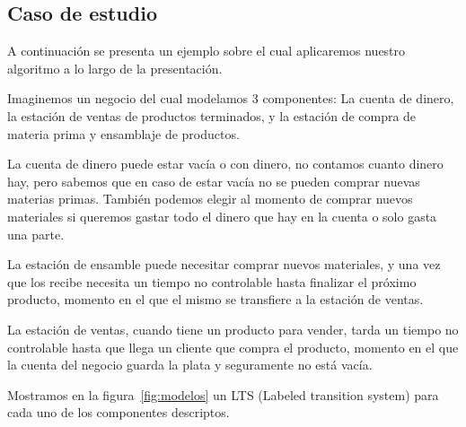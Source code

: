 \documentclass[11pt,a4paper,twoside]{tesis}
\begin{document}
\subsection{Caso de estudio}
A continuación se presenta un ejemplo sobre el cual aplicaremos nuestro algoritmo a lo largo de la presentación. 

Imaginemos un negocio del cual modelamos 3 componentes: La cuenta de dinero, la estación de ventas de productos terminados, y la estación de compra de materia prima y ensamblaje de productos.

La cuenta de dinero puede estar vacía o con dinero, no contamos cuanto dinero hay, pero sabemos que en caso de estar vacía no se pueden comprar nuevas materias primas. También podemos elegir al momento de comprar nuevos materiales si queremos gastar todo el dinero que hay en la cuenta o solo gasta una parte.

La estación de ensamble puede necesitar comprar nuevos materiales, y una vez que los recibe necesita un tiempo no controlable hasta finalizar el próximo producto, momento en el que el mismo se transfiere a la estación de ventas.

La estación de ventas, cuando tiene un producto para vender, tarda un tiempo no controlable hasta que llega un cliente que compra el producto, momento en el que la cuenta del negocio guarda la plata y seguramente no está vacía.

Mostramos en la figura~\ref{fig:modelos} un LTS (Labeled transition system) para cada uno de los componentes descriptos.
\end{document}
